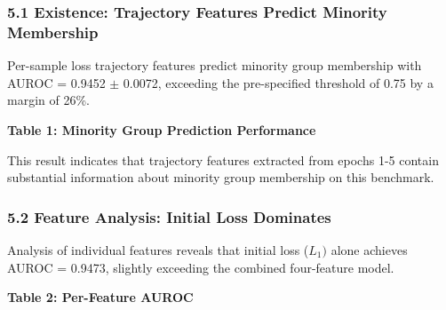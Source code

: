 
\subsubsection{5.1 Existence: Trajectory Features Predict Minority Membership}

Per-sample loss trajectory features predict minority group membership with AUROC = 0.9452 $\pm$ 0.0072, exceeding the pre-specified threshold of 0.75 by a margin of 26\%.

\textbf{Table 1: Minority Group Prediction Performance}

\begin{table}[htbp]
\centering
{}
\end{table}

This result indicates that trajectory features extracted from epochs 1-5 contain substantial information about minority group membership on this benchmark.

\subsubsection{5.2 Feature Analysis: Initial Loss Dominates}

Analysis of individual features reveals that initial loss ($L_{1})$ alone achieves AUROC = 0.9473, slightly exceeding the combined four-feature model.

\textbf{Table 2: Per-Feature AUROC}

\begin{table}[htbp]
\centering
{}
\end{table}


